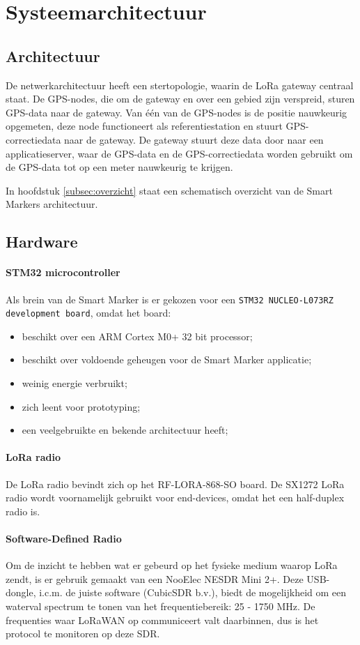 \section{Systeemarchitectuur}
\subsection{Architectuur}
De netwerkarchitectuur heeft een stertopologie, waarin de LoRa gateway centraal staat. De GPS-nodes, die om de gateway en over een gebied zijn verspreid, sturen GPS-data naar de gateway. Van één van de GPS-nodes is de positie nauwkeurig opgemeten, deze node functioneert als referentiestation en stuurt GPS-correctiedata naar de gateway. De gateway stuurt deze data door naar een applicatieserver, waar de GPS-data en de GPS-correctiedata worden gebruikt om de GPS-data tot op een meter nauwkeurig te krijgen.

In hoofdstuk \ref{subsec:overzicht} staat een schematisch overzicht van de Smart Markers architectuur.

\subsection{Hardware}
\paragraph{STM32 microcontroller}
Als brein van de Smart Marker is er gekozen voor een \texttt{STM32 NUCLEO-L073RZ development board}, omdat het board:
\begin{itemize}
    \item beschikt over een ARM Cortex M0+ 32 bit processor;
    \item beschikt over voldoende geheugen voor de Smart Marker applicatie;
    \item weinig energie verbruikt;
    \item zich leent voor prototyping;
    \item een veelgebruikte en bekende architectuur heeft;
\end{itemize}

\paragraph{LoRa radio}
De LoRa radio bevindt zich op het RF-LORA-868-SO board. De SX1272 LoRa radio wordt voornamelijk gebruikt voor end-devices, omdat het een half-duplex radio is.

\paragraph{Software-Defined Radio}
Om de inzicht te hebben wat er gebeurd op het fysieke medium waarop LoRa zendt,
is er gebruik gemaakt van een NooElec NESDR Mini 2+. Deze USB-dongle, i.c.m. de
juiste software (CubicSDR b.v.), biedt de mogelijkheid om een waterval spectrum
te tonen van het frequentiebereik: 25 - 1750 MHz. De frequenties waar LoRaWAN op
communiceert valt daarbinnen, dus is het protocol te monitoren op deze SDR.

